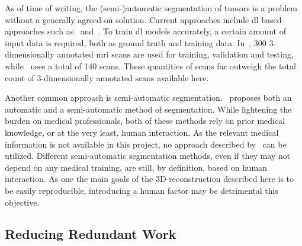 As of time of writing, the (semi-)automatic segmentation of tumors is 
a problem without a generally agreed-on solution. Current approaches include
\ac{dl} based approaches such as~\cite{u-net_auto_anno} and~\cite{dl_rectal_segmentation}. 
To train \ac{dl} models accurately, a certain amount of input data is required, both as ground
truth and training data. In~\cite{u-net_auto_anno}, 300 3-dimensionally annotated \ac{mri} scans
are used for training, validation and testing, while~\cite{dl_rectal_segmentation} uses
a total of 140 scans. These quantities of scans far outweigh the total count of 
\threeDcount{} 3-dimensionally annotated scans available here.

Another common approach is semi-automatic segmentation.~\cite{auto_and_semiauto} proposes 
both an automatic and a semi-automatic method of segmentation. While lightening the burden on
medical professionals, both of these methods rely on prior medical knowledge, or at the 
very least, human interaction. As the relevant medical information is not available in
this project, no approach described by~\cite{auto_and_semiauto} can be utilized.
Different semi-automatic segmentation methods, even if they may not depend on any medical
training, are still, by definition, based on human interaction. As one the main goals
of the 3D-reconstruction described here is to be easily reproducible, introducing a 
human factor may be detrimental this objective.





\subsection{Reducing Redundant Work}\label{sec:save_management}

